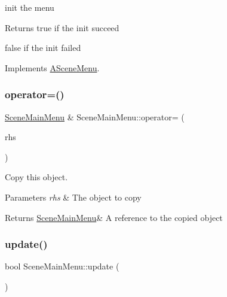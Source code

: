 init the menu 

\begin{DoxyReturn}{Returns}
true if the init succeed 

false if the init failed 
\end{DoxyReturn}


Implements \hyperlink{class_a_scene_menu_a78bdee98bd7df224524586a060f9bdec}{A\+Scene\+Menu}.

\mbox{\label{class_scene_main_menu_a22561df776a39ac604fcd26793875046}} 
\subsubsection{\texorpdfstring{operator=()}{operator=()}}
{\footnotesize\ttfamily \hyperlink{class_scene_main_menu}{Scene\+Main\+Menu} \& Scene\+Main\+Menu\+::operator= (\begin{DoxyParamCaption}\item[{\hyperlink{class_scene_main_menu}{Scene\+Main\+Menu} const \&}]{rhs }\end{DoxyParamCaption})}



Copy this object. 


\begin{DoxyParams}{Parameters}
{\em rhs} & The object to copy \\
\hline
\end{DoxyParams}
\begin{DoxyReturn}{Returns}
\hyperlink{class_scene_main_menu}{Scene\+Main\+Menu}\& A reference to the copied object 
\end{DoxyReturn}
\mbox{\label{class_scene_main_menu_a5d095883d0b1fceb3125ef2689a7a09c}} 
\subsubsection{\texorpdfstring{update()}{update()}}
{\footnotesize\ttfamily bool Scene\+Main\+Menu\+::update (\begin{DoxyParamCaption}{ }\end{DoxyParamCaption})\hspace{0.3cm}{\ttfamily [virtual]}}



